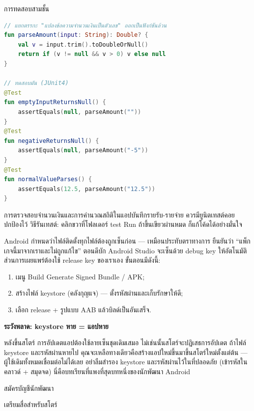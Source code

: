 \begin{center}\small\color{gray}การทดสอบสามชั้น\end{center}

\begin{lstlisting}[language=Kotlin]
// แยกตรรกะ "แปลงข้อความจำนวนเงินเป็นตัวเลข" ออกเป็นฟังก์ชันล้วน
fun parseAmount(input: String): Double? {
    val v = input.trim().toDoubleOrNull()
    return if (v != null && v > 0) v else null
}

// ทดสอบมัน (JUnit4)
@Test
fun emptyInputReturnsNull() {
    assertEquals(null, parseAmount(""))
}
@Test
fun negativeReturnsNull() {
    assertEquals(null, parseAmount("-5"))
}
@Test
fun normalValueParses() {
    assertEquals(12.5, parseAmount("12.5"))
}
\end{lstlisting}

การตรวจสอบจำนวนเงินและการคำนวณสถิติในแอปบันทึกรายรับ-รายจ่าย ควรมียูนิตเทสต์คอยปกป้องไว้ วิธีรันเทสต์: คลิกขวาที่โฟลเดอร์ test Run ถ้าขึ้นเขียวผ่านหมด ก็แก้โค้ดได้อย่างมั่นใจ


Android กำหนดว่าไฟล์ติดตั้งทุกไฟล์ต้องถูกเซ็นก่อน — เหมือนประทับตราทางการ ยืนยันว่า “แพ็กเกจนี้มาจากเราและไม่ถูกแก้ไข” ตอนดีบัก Android Studio จะเซ็นด้วย debug key ให้อัตโนมัติ ส่วนการเผยแพร่ต้องใช้ release key ของเราเอง ขั้นตอนมีดังนี้:

\begin{enumerate}
  \item เมนู Build Generate Signed Bundle / APK;
  \item สร้างไฟล์ keystore (คลังกุญแจ) — ตั้งรหัสผ่านและเก็บรักษาให้ดี;
  \item เลือก release + รูปแบบ AAB แล้วบิลด์เป็นอันเสร็จ.
\end{enumerate}

\textbf{ระวังพลาด: keystore หาย = แอปหาย}\par

หลังขึ้นสโตร์ การอัปเดตแอปต้องใช้ลายเซ็นชุดเดิมเสมอ ไม่เช่นนั้นสโตร์จะปฏิเสธการอัปเดต ถ้าไฟล์ keystore และรหัสผ่านหายไป คุณจะเหลือทางเดียวคือสร้างแอปใหม่ขึ้นมาขึ้นสโตร์ใหม่ตั้งแต่ต้น — ผู้ใช้เดิมทั้งหมดเชื่อมต่อไม่ได้เลย อย่าลืมสำรอง keystore และรหัสผ่านไว้ในที่ปลอดภัย (เข้ารหัสในคลาวด์ + สมุดจด) นี่คือบทเรียนที่แพงที่สุดบทหนึ่งของนักพัฒนา Android


สมัครบัญชีนักพัฒนา

เตรียมสื่อสำหรับสโตร์

